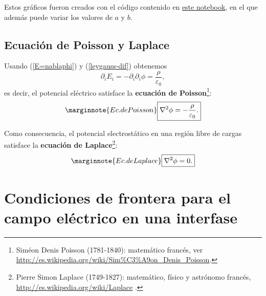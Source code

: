 Estos gráficos fueron creados con el código contenido en \href{https://github.com/gfrubi/electrodinamica/blob/master/notebooks/esfera-cargada.ipynb}{este notebook}, en el que además puede variar los valores de $a$ y $b$.

\subsection{Ecuación de Poisson y Laplace}
Usando (\ref{E=nablaphi}) y (\ref{leygauss-dif}) obtenemos
\begin{equation}
\partial_iE_i  =-\partial_i\partial_i\phi=\frac{\rho}{\varepsilon_0},
\end{equation}
es decir, el potencial eléctrico satisface la \textbf{ecuación de
Poisson}\footnote{Siméon Denis Poisson (1781-1840): matemático francés, ver \url{http://es.wikipedia.org/wiki/Sim\%C3\%A9on_Denis_Poisson}.}:
\begin{equation}\marginnote{Ec. de Poisson}
\boxed{\nabla^2\phi=-\frac{\rho}{\varepsilon_0}.}\label{poisson}
\end{equation}

Como consecuencia, el potencial electrostático en una región libre de cargas
satisface la \textbf{ecuación de Laplace}\footnote{Pierre Simon Laplace (1749-1827): matemático, físico y astrónomo francés, \url{http://es.wikipedia.org/wiki/Laplace} .}:
\begin{equation}\marginnote{Ec. de Laplace}
\boxed{\nabla^2\phi=0.}\label{ecLap}
\end{equation}



\section{Condiciones de frontera para el campo eléctrico en una
interfase}\label{secCBE}

